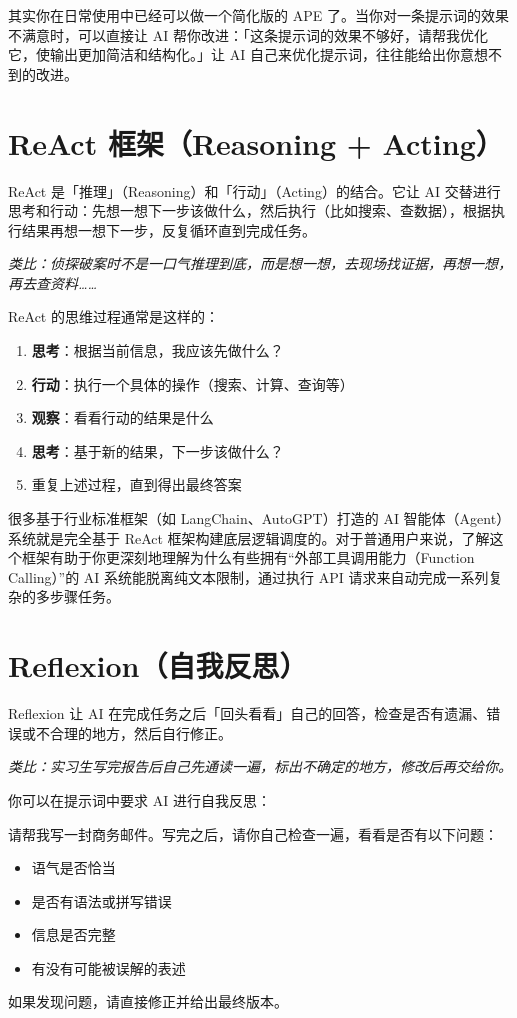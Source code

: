 其实你在日常使用中已经可以做一个简化版的 APE 了。当你对一条提示词的效果不满意时，可以直接让 AI 帮你改进：「这条提示词的效果不够好，请帮我优化它，使输出更加简洁和结构化。」让 AI 自己来优化提示词，往往能给出你意想不到的改进。

\section{ReAct 框架（Reasoning + Acting）}

ReAct 是「推理」（Reasoning）和「行动」（Acting）的结合。它让 AI 交替进行思考和行动：先想一想下一步该做什么，然后执行（比如搜索、查数据），根据执行结果再想一想下一步，反复循环直到完成任务。

\textit{类比：侦探破案时不是一口气推理到底，而是想一想，去现场找证据，再想一想，再去查资料……}

ReAct 的思维过程通常是这样的：

\begin{enumerate}
  \item \textbf{思考}：根据当前信息，我应该先做什么？
  \item \textbf{行动}：执行一个具体的操作（搜索、计算、查询等）
  \item \textbf{观察}：看看行动的结果是什么
  \item \textbf{思考}：基于新的结果，下一步该做什么？
  \item 重复上述过程，直到得出最终答案
\end{enumerate}

很多基于行业标准框架（如 LangChain、AutoGPT）打造的 AI 智能体（Agent）系统就是完全基于 ReAct 框架构建底层逻辑调度的。对于普通用户来说，了解这个框架有助于你更深刻地理解为什么有些拥有“外部工具调用能力（Function Calling）”的 AI 系统能脱离纯文本限制，通过执行 API 请求来自动完成一系列复杂的多步骤任务。

\section{Reflexion（自我反思）}

Reflexion 让 AI 在完成任务之后「回头看看」自己的回答，检查是否有遗漏、错误或不合理的地方，然后自行修正。

\textit{类比：实习生写完报告后自己先通读一遍，标出不确定的地方，修改后再交给你。}

你可以在提示词中要求 AI 进行自我反思：

\begin{promptbox}
请帮我写一封商务邮件。写完之后，请你自己检查一遍，看看是否有以下问题：
\begin{itemize}
  \item 语气是否恰当
  \item 是否有语法或拼写错误
  \item 信息是否完整
  \item 有没有可能被误解的表述
\end{itemize}
如果发现问题，请直接修正并给出最终版本。
\end{promptbox}

